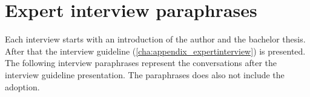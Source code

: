 \chapter{Expert interview paraphrases}

Each interview starts with an introduction of the author and the bachelor thesis.
After that the interview guideline (\ref{cha:appendix_expertinterview}) is presented.
The following interview paraphrases represent the conversations after the interview guideline presentation.
The paraphrases does also not include the adoption.







